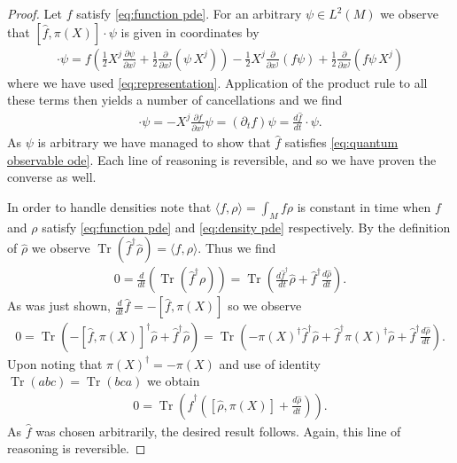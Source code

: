 \documentclass[12pt]{amsart}
\newcommand{\pder}[2]{\ensuremath{\frac{ \partial #1}{\partial #2}}}
\DeclareMathOperator{\Tr}{Tr}
\begin{document}
\begin{proof}
	Let $f$ satisfy \eqref{eq:function pde}.
	For an arbitrary $\psi \in L^{2}(M)$ we observe that $[ \hat{f} , \pi(X)] \cdot \psi$ is given in coordinates by
	\begin{align*}
		[ \hat{f} , \pi(X) ] \cdot \psi = f \left( \frac{1}{2} X^{j} \pder{\psi}{x^{j}} + \frac{1}{2} \pder{}{x^{j}} ( \psi \, X^{j} ) \right)
			- \frac{1}{2} X^{j} \pder{}{x^{j}}( f \psi)  + \frac{1}{2} \pder{}{x^{j}} (f \psi \, X^{j} )
	\end{align*}
	where we have used \eqref{eq:representation}.  Application of the product rule to all these terms then yields
	a number of cancellations and we find
	\begin{align*}
		[ \hat{f} , \pi(X) ] \cdot \psi = - X^{j} \pder{f}{x^{j}} \psi = (\partial_{t} f )\psi = \frac{d \hat{f} }{dt} \cdot \psi.
	\end{align*}
	As $\psi$ is arbitrary we have managed to show that $\hat{f}$ satisfies \eqref{eq:quantum observable ode}.
	Each line of reasoning is reversible, and so we have proven the converse as well.
	
	In order to handle densities note that $\langle f , \rho \rangle = \int_{M} f\rho$ is constant in time when $f$
	and $\rho$ satisfy \eqref{eq:function pde} and \eqref{eq:density pde} respectively.
	By the definition of $\hat{\rho}$ we observe $\Tr( \hat{f}^{\dagger} \hat{\rho}) = \langle f , \rho \rangle$.
	Thus we find
	\begin{align*}
		0 = \frac{d}{dt} \left( \Tr( \hat{f}^{\dagger} \rho ) \right) = \Tr \left( \frac{d \hat{f}^{\dagger}}{dt} \hat{\rho} + \hat{f}^{\dagger} \frac{d \hat{\rho}}{dt} \right).
	\end{align*}
	As was just shown, $\frac{d}{dt} \hat{f} =  - [\hat{f} , \pi(X) ]$ so we observe
	\begin{align*}
		0 = \Tr( - [\hat{f} , \pi(X) ]^{\dagger} \hat{\rho} + \hat{f}^{\dagger} \hat{\rho} ) = \Tr( - \pi(X)^{\dagger} \hat{f}^{\dagger} \hat{\rho} + \hat{f}^{\dagger} \pi(X)^{\dagger} \hat{\rho} + \hat{f}^{\dagger} \frac{d\hat{\rho}}{dt} ).
	\end{align*}
	Upon noting that $\pi(X)^{\dagger} = - \pi(X)$ and use of identity $\Tr( a b c) = \Tr( bc a)$ we obtain
	\begin{align*}
		0 = \Tr \left( \hat{f}^{\dagger}( [\hat{\rho} , \pi(X) ] + \frac{d \hat{\rho}}{dt} ) \right).
	\end{align*}
	As $\hat{f}$ was chosen arbitrarily, the desired result follows.
	Again, this line of reasoning is reversible.
	

\end{proof}
\end{document}
